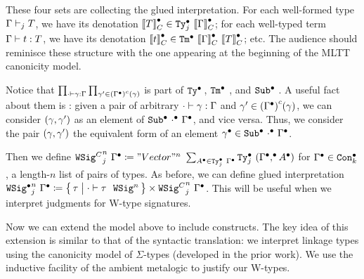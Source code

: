 These four sets are collecting the glued interpretation.
For each well-formed type $\goodType{\Gm}{T}{j}$, we have its denotation $\denotesCC{T} \in \GTy{j}{\denotesCC{\Gm}}$;
for each well-typed term $\goodTerm{\Gm}{t}{T}$, we have its denotation $\denotesCC{t} \in \GTm{\denotesCC{\Gm}}{\denotesCC{T}}$;
etc. The audience should reminisce these structure with the one appearing at the beginning of the MLTT canonicity model.


Notice that
$\prod_{\goodSub{\cdot}{\gm}{\Gm}} \prod_{\gm' \in \Gmodel{\Glued{\Gm}}(\gm)}$
is part of $\GTy{\!}{\!}$, $\GTm{\!}{\!}$, and $\GSub{\!}{\!}$.
A useful fact about them is : given a pair of arbitrary $\goodSub{\cdot}{\gm}{\Gm}$
and $\gm' \in \Gmodel{\Glued{\Gm}}(\gm)$, we can consider $(\gm, \gm')$ as an
element of $\GSub{\Glued{\cdot}}{\Glued{\Gm}}$, and vice versa.
Thus, we consider the pair $(\gm,
\gm')$ the equivalent form of an element $\Glued{\gm} \in \GSub{\Glued{\cdot}}{\Glued{\Gm}}$.


Then we define $\GMWSig{j}{\Glued{\Gm}}{n} \coloneq "Vector"^n~\sum_{\Glued{A}
\in \GTy{j}{\Glued{\Gm}}} \GTy{j}{(\GSubstExt{\Glued{\Gm}}{\Glued{A}})}$ for
$\Glued{\Gm} \in \GCon{k}$, a length-$n$ list of pairs of types.
As before, we can define glued interpretation $\GWSig{j}{\Glued{\Gm}}{n}
\coloneq 
\setc{\wsig}{\goodWSig{\cdot}{\wsig}{n}}
\times
\GMWSig{j}{\Glued{\Gm}}{n}$. This will be useful when we interpret judgments for
W-type signatures.


Now we can extend the model above to include \TT constructs.
The key idea of this extension is similar to that of the syntactic translation:
we interpret linkage types using the canonicity model of $\Sigma$-types (developed in the prior work).
We use the inductive facility of the ambient meta\-logic to justify our W-types. 

\newcommand{\CWmodel}{\ensuremath{\mathit{W}^C}}
\newcommand{\CWsup}{\ensuremath{\mathit{W^Csup}}}
\newcommand{\CWrec}{\ensuremath{\mathit{W^Crec}}}

